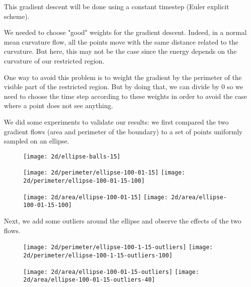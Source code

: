 This gradient descent will be done using a constant timestep (Euler explicit
scheme).

We needed to choose "good" weights for the gradient descent. Indeed, in a normal
mean curvature flow, all the points move with the same distance related to the
curvature. But here, this may not be the case since the energy depends on the
curvature of our restricted region.

One way to avoid this problem is to weight the gradient by the perimeter of the
visible part of the restricted region. But by doing that, we can divide by $ 0 $
so we need to choose the time step according to these weights in order to avoid
the case where a point does not see anything.


We did some experiments to validate our results: we first compared the two
gradient flows (area and perimeter of the boundary) to a set of points uniformly
sampled on an ellipse.

\begin{figure}[H]
    \centering

    \texttt{[image: 2d/ellipse-balls-15]}

    \texttt{[image: 2d/perimeter/ellipse-100-01-15]}
    \texttt{[image: 2d/perimeter/ellipse-100-01-15-100]}
    \label{fig:ellipse_perimeter_flow}

    \texttt{[image: 2d/area/ellipse-100-01-15]}
    \texttt{[image: 2d/area/ellipse-100-01-15-100]}
    \label{fig:ellipse_area_flow}
\end{figure}


Next, we add some outliers around the ellipse and observe the effects of the two
flows.

\begin{figure}[H]
    \centering

    \texttt{[image: 2d/perimeter/ellipse-100-1-15-outliers]}
    \texttt{[image: 2d/perimeter/ellipse-100-1-15-outliers-100]}
    \label{fig:ellipse_outliers_perimeter_flow}

    \texttt{[image: 2d/area/ellipse-100-01-15-outliers]}
    \texttt{[image: 2d/area/ellipse-100-01-15-outliers-40]}
    \label{fig:ellipse_outliers_area_flow}
\end{figure}

